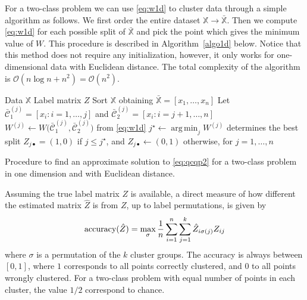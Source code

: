 \documentclass[aps,preprint,nofootinbib,floatfix]{revtex4-1}
\DeclareMathOperator*{\argmin}{arg\,min}
\newcommand\C{{\mathcal{C}}}
\newcommand\OO{{\mathcal{O}}}
\begin{document}
For a two-class problem we can use \eqref{eq:w1d} to cluster data
through a simple algorithm 
as follows. We first order
the entire dataset $\mathbb{X} \to \bar{\mathbb{X}}$. Then 
we compute \eqref{eq:w1d} for each possible split of $\bar{\mathbb{X}}$
and pick the point which gives the minimum value of $W$. 
This procedure is described in Algorithm~\ref{algo1d} below. 
Notice that
this method does not require any initialization,
however,
it only works for one-dimensional data with Euclidean distance. The total
complexity of the algorithm is $\OO(n\log n + n^2) = \OO(n^2)$.

\begin{algorithm}[H]\vspace{.5em}
\begin{algorithmic}[1]
\INPUT Data $\mathbb{X}$
\OUTPUT Label matrix $Z$
\STATE Sort $\mathbb{X}$ obtaining 
$\bar{\mathbb{X}}= [ x_1,\dotsc,x_n ]$
        \STATE Let $\bar{\C}_1^{(j)} = [x_i: i=1,\dotsc,j]$ and 
                $\bar{\C}_2^{(j)} = [x_i : i=j+1,\dotsc,n]$
        \STATE  
            $W^{(j)} \leftarrow W \big( \bar{\C}_1^{(j)},\bar{\C}_2^{(j)}  
            \big)$ from \eqref{eq:w1d}
    \ENDFOR
    \STATE $j^\star \leftarrow \argmin_j W^{(j)}$ determines the best split
    \STATE $Z_{j\bullet} = (1,0) $ if $j\le j^\star$, and
           $Z_{j\bullet} \leftarrow (0,1)$ otherwise, for $j=1,\dotsc,n$
\end{algorithmic}
\caption{\label{algo1d}
Procedure to find an approximate solution to \eqref{eq:qcqp2} 
for a two-class problem in one dimension and with Euclidean distance.}
\end{algorithm}

Assuming the true label matrix $Z$ is available, a direct
measure of how different the estimated matrix $\hat{Z}$ 
is from $Z$, up to label
permutations, is given by
\begin{equation}
\label{eq:accuracy}
\textnormal{accuracy}(\hat{Z}) = \max_\sigma 
\dfrac{1}{n}\sum_{i=1}^n\sum_{j=1}^k \hat{Z}_{i \sigma(j)} Z_{ij}
\end{equation}
where $\sigma$ is a permutation
of the $k$ cluster groups. 
The accuracy is always between $[0,1]$, where
$1$ corresponds to all points correctly clustered, and 
$0$ to all points wrongly clustered.
For a two-class problem with equal
number of points in each cluster, the value $1/2$ correspond
to chance.
\end{document}
